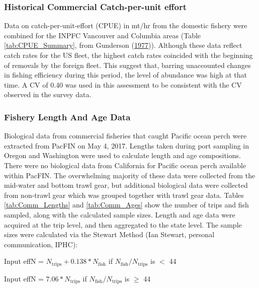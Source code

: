 \documentclass[12pt,]{article}
\begin{document}
\subsubsection{Historical Commercial Catch-per-unit
effort}\label{historical-commercial-catch-per-unit-effort}

Data on catch-per-unit-effort (CPUE) in mt/hr from the domestic fishery
were combined for the INPFC Vancouver and Columbia areas (Table
\ref{tab:CPUE_Summary}, from Gunderson
(\protect\hyperlink{ref-gunderson_population_1977}{1977})). Although
these data reflect catch rates for the US fleet, the highest catch rates
coincided with the beginning of removals by the foreign fleet. This
suggest that, barring unaccounted changes in fishing efficiency during
this period, the level of abundance was high at that time. A CV of 0.40
was used in this assessment to be consistent with the CV observed in the
survey data.

\subsubsection{Fishery Length And Age
Data}\label{fishery-length-and-age-data}

Biological data from commercial fisheries that caught Pacific ocean
perch were extracted from PacFIN on May 4, 2017. Lengths taken during
port sampling in Oregon and Washington were used to calculate length and
age compositions. There were no biological data from California for
Pacific ocean perch available within PacFIN. The overwhelming majority
of these data were collected from the mid-water and bottom trawl gear,
but additional biological data were collected from non-trawl gear which
was grouped together with trawl gear data. Tables \ref{tab:Comm_Lengths}
and \ref{tab:Comm_Ages} show the number of trips and fish sampled, along
with the calculated sample sizes. Length and age data were acquired at
the trip level, and then aggregated to the state level. The sample sizes
were calculated via the Stewart Method (Ian Stewart, personal
communication, IPHC):

\begin{centering}

Input effN = $N_{\text{trips}} + 0.138 * N_{\text{fish}}$ if $N_{\text{fish}}/N_{\text{trips}}$ is $<$ 44

Input effN = $7.06 * N_{\text{trips}}$ if $N_{\text{fish}}/N_{\text{trips}}$ is $\geq$ 44

\end{centering}
\end{document}
